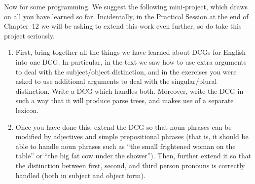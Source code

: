 Now for some programming. We suggest the following mini-project, which
draws on all you have learned so far. Incidentally, in the Practical
Session at the end of Chapter~12 we will be asking to extend this work
even further, so do take this project seriously.
\begin{enumerate}
\item{}First, bring together all the things we have learned about DCGs
for English into one DCG. In particular, in the text we saw how to use
extra arguments to deal with the subject/object distinction, and in
the exercises you were asked to use additional arguments to deal with
the singular/plural distinction. Write a DCG which handles
both. Moreover, write the DCG in such a way that it will produce parse
trees, and makes use of a separate lexicon.
\item{}Once you have done this, extend the DCG so that noun phrases can
be modified by adjectives and simple prepositional phrases (that is,
it should be able to handle noun phrases such as ``the small
frightened woman on the table'' or ``the big fat cow under the
shower''). Then, further extend it so that the distinction between
first, second, and third person pronouns is correctly handled (both in
subject and object form).
\end{enumerate}
